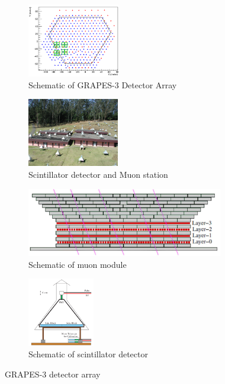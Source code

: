 \documentclass[12pt]{article}
\begin{document}
\begin{figure}[h]
\begin{subfigure}{0.245\textwidth}
\includegraphics[width=0.9\linewidth, height=3.2cm]{array-map} 
\caption{Schematic of GRAPES-3 Detector Array}
\label{fig:array-map}
\end{subfigure}
\begin{subfigure}{0.245\textwidth}
\includegraphics[width=0.9\linewidth, height=3cm]{detector} 
\caption{Scintillator detector and Muon station}
\label{fig:detector}
\end{subfigure}
\begin{subfigure}{0.245\textwidth}
\includegraphics[width=0.9\linewidth, height = 3cm]{mu-station} 
\caption{Schematic of muon module}
\label{fig:mu-station}
\end{subfigure}
\begin{subfigure}{0.245\textwidth}
\includegraphics[width=0.9\linewidth, height = 3cm]{sc-detector}
\caption{Schematic of scintillator detector}
\label{fig:sc-detector}
\end{subfigure}
\caption{GRAPES-3 detector array}
\label{fig:g3array}
\end{figure}
 
\end{document}
